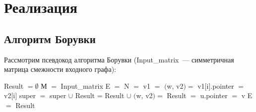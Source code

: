\documentclass[14pt]{matmex-diploma-custom}
\begin{document}
\section{Реализация}
\subsection{Алгоритм Борувки}\label{4}
Рассмотрим псевдокод алгоритма Борувки (Input\_matrix~--- симметричная матрица смежности входного графа):
\begin{algorithmic}[1]
\State Result $= \emptyset$
\State М $=$ Input\_matrix             
\State E $=$ 
\State N $=$ 
\State v1 $=$ 
    \State $($w, v2$) =$ 
    	\State v1$[$i$]$.pointer $=$ v2$[$i$]$
    \EndFor
            \State super $=$ super $\cup$ 
        \EndIf
    \EndFor
    \State Result = Result $\cup$ 
    \State $($w, v2$) =$ 
    \State Result $=$  
            \State u.pointer $=$ v
        \EndFor
    \EndFor
    \State {}
    \State E $=$ 
\EndWhile
\State \Return Result
\EndFunction
\end{algorithmic}
\end{document}
